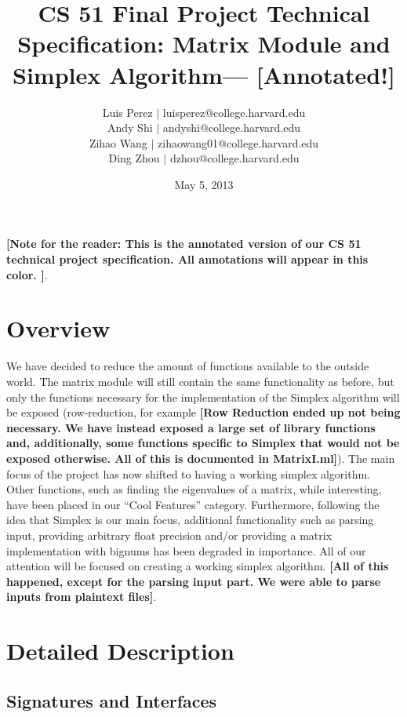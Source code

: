 \documentclass[letterpaper,11pt]{article}
\newcommand{\annot}[1]{\textbf{\color{BrickRed} [#1]}}
\begin{document}
\title{CS 51 Final Project Technical Specification: Matrix Module and Simplex Algorithm---{\annot{Annotated!}}}
\author{
Luis Perez $|$ luisperez@college.harvard.edu \\ 
Andy Shi $|$ andyshi@college.harvard.edu \\ 
Zihao Wang $|$ zihaowang01@college.harvard.edu \\ 
Ding Zhou $|$ dzhou@college.harvard.edu
}
\date{May 5, 2013}
\maketitle

{\annot{Note for the reader: This is the annotated version of our CS 51 
technical project specification. All annotations will appear in this color. }}.

\section{Overview}

We have decided to reduce the amount of functions available to the outside
world. The matrix module will still contain the same functionality as before,
but only the functions necessary for the implementation of the Simplex algorithm
will be exposed (row-reduction, for example{\annot{Row Reduction ended up not
being necessary. We have instead exposed a large set of library functions and,
additionally, some functions specific to Simplex that would not be exposed otherwise.
All of this is documented in MatrixI.ml}}). The main focus of the project has
now shifted to having a working simplex algorithm. Other functions, such as
finding the eigenvalues of a matrix, while interesting, have been placed in our
“Cool Features” category. Furthermore, following the idea that Simplex is our
main focus, additional functionality such as parsing input, providing arbitrary
float precision and/or providing a matrix implementation with bignums has been
degraded in importance. All of our attention will be focused on creating a
working simplex algorithm. {\annot{All of this happened, except for the parsing input part. We were able to parse inputs from plaintext files}}.

\section{Detailed Description}
\subsection{Signatures and Interfaces}
\end{document}
